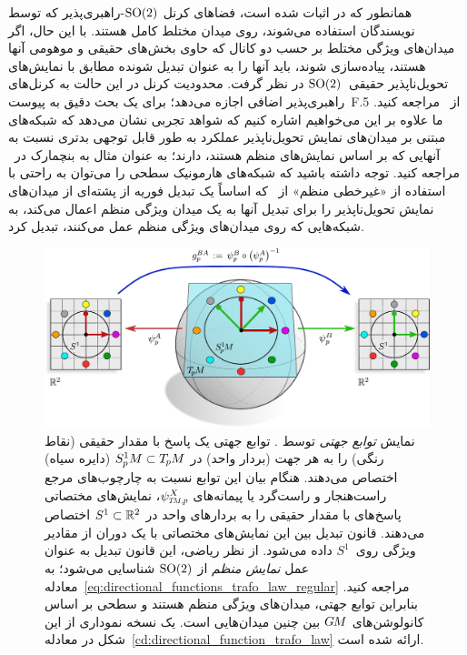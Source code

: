 همانطور که در \cite{lang2020WignerEckart,Weiler2019_E2CNN} اثبات شده است، فضاهای کرنل $\operatorname{SO}(2)$-راهبری‌پذیر که توسط نویسندگان استفاده می‌شوند، روی میدان مختلط کامل هستند.
با این حال، اگر میدان‌های ویژگی مختلط بر حسب دو کانال که حاوی بخش‌های حقیقی و موهومی آنها هستند، پیاده‌سازی شوند، باید آنها را به عنوان تبدیل شونده مطابق با نمایش‌های تحویل‌ناپذیر حقیقی~$\operatorname{SO}(2)$ در نظر گرفت.
محدودیت کرنل در این حالت به کرنل‌های راهبری‌پذیر اضافی اجازه می‌دهد؛ برای یک بحث دقیق به پیوست~F.5 از~\cite{Weiler2019_E2CNN} مراجعه کنید.
ما علاوه بر این می‌خواهیم اشاره کنیم که شواهد تجربی نشان می‌دهد که شبکه‌های مبتنی بر میدان‌های نمایش تحویل‌ناپذیر عملکرد به طور قابل توجهی بدتری نسبت به آنهایی که بر اساس نمایش‌های منظم هستند، دارند؛ به عنوان مثال به بنچمارک در~\cite{Weiler2019_E2CNN} مراجعه کنید.
توجه داشته باشید که شبکه‌های هارمونیک سطحی را می‌توان به راحتی با استفاده از «غیرخطی منظم» از~\cite{deHaan2020meshCNNs} که اساساً یک تبدیل فوریه از پشته‌ای از میدان‌های نمایش تحویل‌ناپذیر را برای تبدیل آنها به یک میدان ویژگی منظم اعمال می‌کند، به شبکه‌هایی که روی میدان‌های ویژگی منظم عمل می‌کنند، تبدیل کرد.


\begin{figure}
    \centering
    \includegraphics[width=1.\textwidth]{figures/directional_function.pdf}
    \caption{\small
        نمایش \emph{توابع جهتی} توسط \citet{poulenard2018multi}.
        توابع جهتی یک پاسخ با مقدار حقیقی (نقاط رنگی) را به هر جهت (بردار واحد) در $S^1_{\mkern-.5mu p}\mkern-.5muM \subset T_{\mkern-1.5mu p}\mkern-.5muM$ (دایره سیاه) اختصاص می‌دهند.
        هنگام بیان این توابع نسبت به چارچوب‌های مرجع راست‌هنجار و راست‌گرد یا پیمانه‌های $\psiTMp^X$، نمایش‌های مختصاتی پاسخ‌های با مقدار حقیقی را به بردارهای واحد در $S^1 \subset \mathbb{R}^2$ اختصاص می‌دهند.
        قانون تبدیل بین این نمایش‌های مختصاتی با یک دوران از مقادیر ویژگی روی~$S^1$ داده می‌شود.
        از نظر ریاضی، این قانون تبدیل به عنوان عمل \emph{نمایش منظم} از $\operatorname{SO}(2)$ شناسایی می‌شود؛ به معادله~\eqref{eq:directional_functions_trafo_law_regular} مراجعه کنید.
        بنابراین توابع جهتی، میدان‌های ویژگی منظم هستند و  سطحی \citet{poulenard2018multi} بر اساس کانولوشن‌های $G\mkern-1.4muM$ بین چنین میدان‌هایی است.
        یک نسخه نموداری از این شکل در معادله~\eqref{cd:directional_function_trafo_law} ارائه شده است.
    }
    \label{fig:directional_function}
\end{figure}


